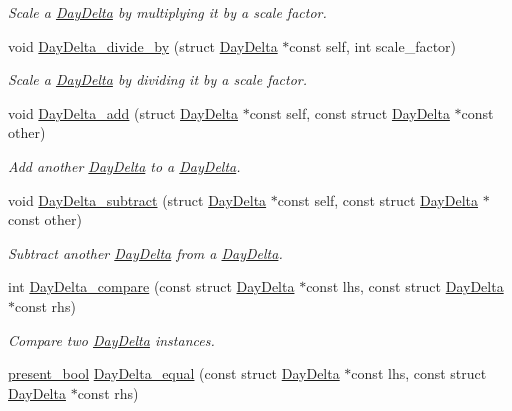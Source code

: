 \begin{DoxyCompactItemize}
\begin{DoxyCompactList}\small\item\em \-Scale a \hyperlink{structDayDelta}{\-Day\-Delta} by multiplying it by a scale factor. \end{DoxyCompactList}\item 
void \hyperlink{day-delta_8h_a03f5153b765a355870053d9cf1ce5c78}{\-Day\-Delta\-\_\-divide\-\_\-by} (struct \hyperlink{structDayDelta}{\-Day\-Delta} $\ast$const self, int scale\-\_\-factor)
\begin{DoxyCompactList}\small\item\em \-Scale a \hyperlink{structDayDelta}{\-Day\-Delta} by dividing it by a scale factor. \end{DoxyCompactList}\item 
void \hyperlink{day-delta_8h_a1d879b02971a0c302622e56b577ceb23}{\-Day\-Delta\-\_\-add} (struct \hyperlink{structDayDelta}{\-Day\-Delta} $\ast$const self, const struct \hyperlink{structDayDelta}{\-Day\-Delta} $\ast$const other)
\begin{DoxyCompactList}\small\item\em \-Add another \hyperlink{structDayDelta}{\-Day\-Delta} to a \hyperlink{structDayDelta}{\-Day\-Delta}. \end{DoxyCompactList}\item 
void \hyperlink{day-delta_8h_a6fd32ca3c633ebe279df2a468fd1d91e}{\-Day\-Delta\-\_\-subtract} (struct \hyperlink{structDayDelta}{\-Day\-Delta} $\ast$const self, const struct \hyperlink{structDayDelta}{\-Day\-Delta} $\ast$const other)
\begin{DoxyCompactList}\small\item\em \-Subtract another \hyperlink{structDayDelta}{\-Day\-Delta} from a \hyperlink{structDayDelta}{\-Day\-Delta}. \end{DoxyCompactList}\item 
int \hyperlink{day-delta_8h_a9c2839c462e80f6419bb9e55f1744eab}{\-Day\-Delta\-\_\-compare} (const struct \hyperlink{structDayDelta}{\-Day\-Delta} $\ast$const lhs, const struct \hyperlink{structDayDelta}{\-Day\-Delta} $\ast$const rhs)
\begin{DoxyCompactList}\small\item\em \-Compare two \hyperlink{structDayDelta}{\-Day\-Delta} instances. \end{DoxyCompactList}\item 
\hyperlink{types_8h_a1c24e2cdd988b886e889080ded176ae0}{present\-\_\-bool} \hyperlink{day-delta_8h_aec7bbfd9ee83f64b94117028c4d856f5}{\-Day\-Delta\-\_\-equal} (const struct \hyperlink{structDayDelta}{\-Day\-Delta} $\ast$const lhs, const struct \hyperlink{structDayDelta}{\-Day\-Delta} $\ast$const rhs)

\end{DoxyCompactItemize}
